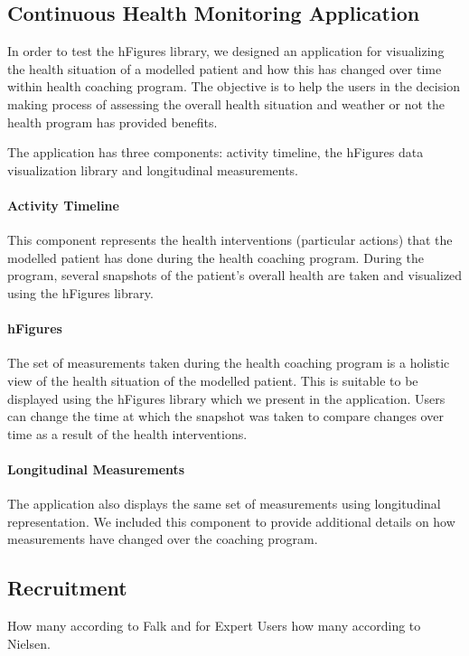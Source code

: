 \documentclass[twocolumn]{bmcart}%
\begin{document}
\subsection*{Continuous Health Monitoring Application}

In order to test the hFigures library, we designed an application for visualizing the health situation of a modelled patient and how this has changed over time within health coaching program. The objective is to help the users in the decision making process of assessing the overall health situation and weather or not the health program has provided benefits.

The application has three components: activity timeline, the hFigures data visualization library and longitudinal measurements.

\paragraph*{Activity Timeline} This component represents the health interventions (particular actions) that the modelled patient has done during the health coaching program. During the program, several snapshots of the patient's overall health are taken and visualized using the hFigures library.

\paragraph*{hFigures} The set of measurements taken during the health coaching program is a holistic view of the health situation of the modelled patient. This is suitable to be displayed using the hFigures library which we present in the application. Users can change the time at which the snapshot was taken to compare changes over time as a result of the health interventions.

\paragraph*{Longitudinal Measurements} The application also displays the same set of measurements using longitudinal representation. We included this component to provide additional details on how measurements have changed over the coaching program.

\subsection*{Recruitment}

How many according to Falk and for Expert Users how many according to Nielsen.
\end{document}
